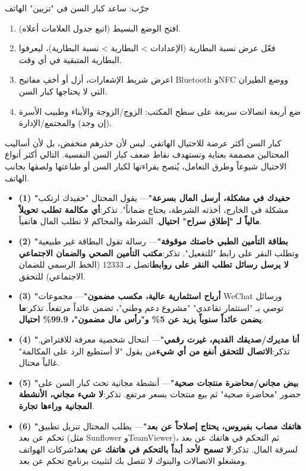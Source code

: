 \begin{tcbpractice}{جرّب: ساعد كبار السن في "تزيين" الهاتف}
\begin{enumerate}
  \item افتح الوضع البسيط (اتبع جدول العلامات أعلاه).
  \item فعّل عرض نسبة البطارية (الإعدادات > البطارية > نسبة البطارية)، ليعرفوا البطارية المتبقية في أي وقت.
  \item اعرض شريط الإشعارات، أزل أو أخفِ مفاتيح Bluetooth وNFC ووضع الطيران التي لا يحتاجها كبار السن.
  \item ضع أربعة اتصالات سريعة على سطح المكتب: الزوج/الزوجة والأبناء وطبيب الأسرة (إن وجد) والمجتمع/الإدارة.
\end{enumerate}

\end{tcbpractice}


كبار السن أكثر عرضة للاحتيال الهاتفي. ليس لأن حذرهم منخفض، بل لأن أساليب المحتالين مصممة بعناية وتستهدف نقاط ضعف كبار السن النفسية. التالي أكثر أنواع الاحتيال شيوعاً وطرق التعامل، يُنصح بقراءتها لكبار السن أو طباعتها ولصقها بجانب الهاتف.


\begin{itemize}
  \item \textbf{(1) "حفيدك في مشكلة، أرسل المال بسرعة"}— يقول المحتال "حفيدك ارتكب مشكلة في الخارج، أخذته الشرطة، يحتاج ضماناً". تذكر:\textbf{أي مكالمة تطلب تحويلاً مالياً لـ "إطلاق سراح" احتيال}. الشرطة والمحاكم لا تطلب المال هاتفياً.
  \item \textbf{(2) "بطاقة التأمين الطبي خاصتك موقوفة"}— رسالة تقول البطاقة غير طبيعية وتطلب النقر على رابط "للتفعيل". تذكر:\textbf{مكتب التأمين الصحي والضمان الاجتماعي لا يرسل رسائل تطلب النقر على روابط}اتصل بـ 12333 (الخط الرسمي للضمان الاجتماعي) للتحقق.
  \item \textbf{(3) "أرباح استثمارية عالية، مكسب مضمون"}— مجموعات WeChat ورسائل توصي بـ "استثمار تقاعدي" "مشروع دعم وطني"، تضمن عائداً مرتفعاً. تذكر:\textbf{ما يضمن عائداً سنوياً يزيد عن 5\% و"رأس مال مضمون"، 99.9\% احتيال}.
  \item \textbf{(4) "أنا مديرك/صديقك القديم، غيرت رقمي"}— انتحال شخصية معرفة للاقتراض. تذكر:\textbf{الاتصال للتحقق أنفع من أي شيء}من يقول "لا أستطيع الرد على المكالمة" غالباً محتال.
  \item \textbf{(5) "بيض مجاني/محاضرة منتجات صحية"}— أنشطة مجانية تحث كبار السن على حضور "محاضرة صحية" ثم بيع منتجات بسعر مرتفع. تذكر:\textbf{لا شيء مجاني، الأنشطة المجانية وراءها تجارة}.
  \item \textbf{(6) "هاتفك مصاب بفيروس، يحتاج إصلاحاً عن بعد"}— يطلب المحتال تنزيل تطبيق تحكم عن بعد (مثل Sunflower وTeamViewer)، ثم التحكم في هاتفك عن بعد لسرقة المال. تذكر:\textbf{لا تسمح لأحد أبداً بالتحكم في هاتفك عن بعد!}شركات الهواتف ومشغلو الاتصالات والبنوك لا تتصل بك لتثبيت برنامج تحكم عن بعد.
\end{itemize}

